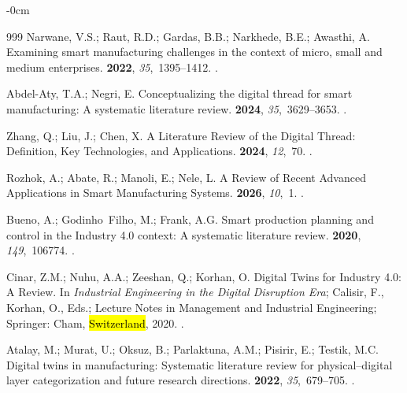 \documentclass[systems,article,accept,pdftex,moreauthors]{Definitions/mdpi}
\begin{document}
\begin{adjustwidth}{-\extralength}{0cm}
\begin{thebibliography}{999}
Narwane, V.S.; Raut, R.D.; Gardas, B.B.; Narkhede, B.E.; Awasthi, A.
\newblock Examining smart manufacturing challenges in the context of micro,
  small and medium enterprises.
 {\bf 2022}, {\em
  35},~1395--1412.
.

Abdel-Aty, T.A.; Negri, E.
\newblock Conceptualizing the digital thread for smart manufacturing: A
  systematic literature review.
 {\bf 2024}, {\em 35},~3629--3653.
.

Zhang, Q.; Liu, J.; Chen, X.
\newblock A Literature Review of the Digital Thread: Definition, Key
  Technologies, and Applications.
 {\bf 2024}, {\em 12},~70.
.

Rozhok, A.; Abate, R.; Manoli, E.; Nele, L.
\newblock A Review of Recent Advanced Applications in Smart Manufacturing
  Systems.
 {\bf 2026}, {\em 10},~1.
.

Bueno, A.; Godinho~Filho, M.; Frank, A.G.
\newblock Smart production planning and control in the Industry 4.0 context: A
  systematic literature review.
 {\bf 2020}, {\em 149},~106774.
.

Cinar, Z.M.; Nuhu, A.A.; Zeeshan, Q.; Korhan, O.
\newblock Digital Twins for Industry 4.0: A Review. In {\em Industrial
  Engineering in the Digital Disruption Era}; Calisir, F., Korhan, O., Eds.;
  Lecture Notes in Management and Industrial Engineering; Springer: Cham, \hl{Switzerland}, 
  2020.%
.

Atalay, M.; Murat, U.; Oksuz, B.; Parlaktuna, A.M.; Pisirir, E.; Testik, M.C.
\newblock Digital twins in manufacturing: Systematic literature review for
  physical--digital layer categorization and future research directions.
 {\bf 2022}, {\em 35},~679--705.
.


\end{thebibliography}
\end{adjustwidth}
\end{document}
